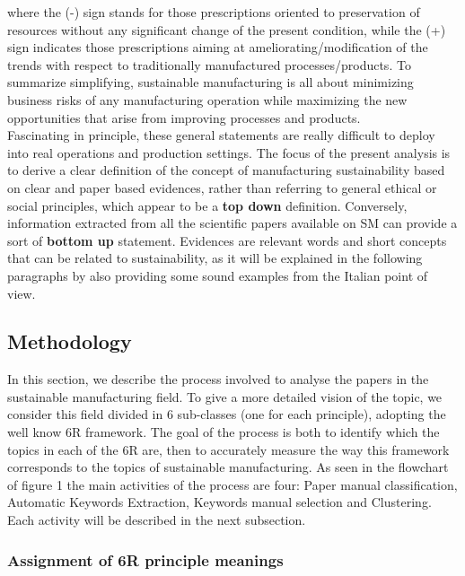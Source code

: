 \documentclass[b5paper,]{book}
\theoremstyle{definition}
\theoremstyle{definition}
\theoremstyle{definition}
\theoremstyle{remark}
\begin{document}
where the (-) sign stands for those prescriptions oriented to
preservation of resources without any significant change of the present
condition, while the (+) sign indicates those prescriptions aiming at
ameliorating/modification of the trends with respect to traditionally
manufactured processes/products. To summarize simplifying, sustainable
manufacturing is all about minimizing business risks of any
manufacturing operation while maximizing the new opportunities that
arise from improving processes and products.\\
Fascinating in principle, these general statements are really difficult
to deploy into real operations and production settings. The focus of the
present analysis is to derive a clear definition of the concept of
manufacturing sustainability based on clear and paper based evidences,
rather than referring to general ethical or social principles, which
appear to be a \textbf{top down} definition. Conversely, information
extracted from all the scientific papers available on SM can provide a
sort of \textbf{bottom up} statement. Evidences are relevant words and
short concepts that can be related to sustainability, as it will be
explained in the following paragraphs by also providing some sound
examples from the Italian point of view.

\subsection{Methodology}\label{methodology-2}

In this section, we describe the process involved to analyse the papers
in the sustainable manufacturing field. To give a more detailed vision
of the topic, we consider this field divided in 6 sub-classes (one for
each principle), adopting the well know 6R framework. The goal of the
process is both to identify which the topics in each of the 6R are, then
to accurately measure the way this framework corresponds to the topics
of sustainable manufacturing. As seen in the flowchart of figure 1 the
main activities of the process are four: Paper manual classification,
Automatic Keywords Extraction, Keywords manual selection and Clustering.
Each activity will be described in the next subsection.

\subsubsection*{Assignment of 6R principle
meanings}\label{assignment-of-6r-principle-meanings}
\end{document}
